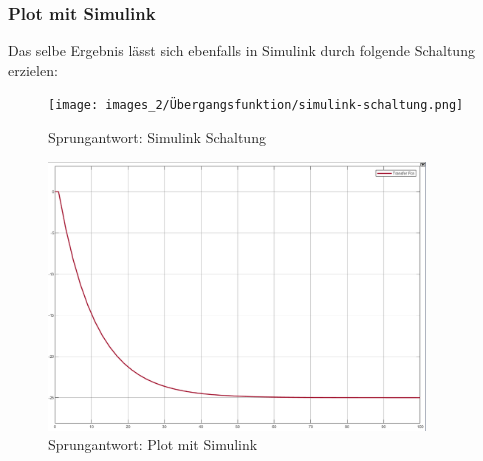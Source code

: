\subsubsection{Plot mit Simulink}
Das selbe Ergebnis lässt sich ebenfalls in Simulink durch folgende Schaltung erzielen:
\begin{figure}[H]
    \centering
    \texttt{[image: images\_2/Übergangsfunktion/simulink-schaltung.png]}
    \caption{Sprungantwort: Simulink Schaltung}
\end{figure}
\begin{figure}[H]
    \centering
    \includegraphics[width=10cm]{images_2/Übergangsfunktion/übergangsfkt_simulink-plot.png}
    \caption{Sprungantwort: Plot mit Simulink}
\end{figure}













        
%
                    



